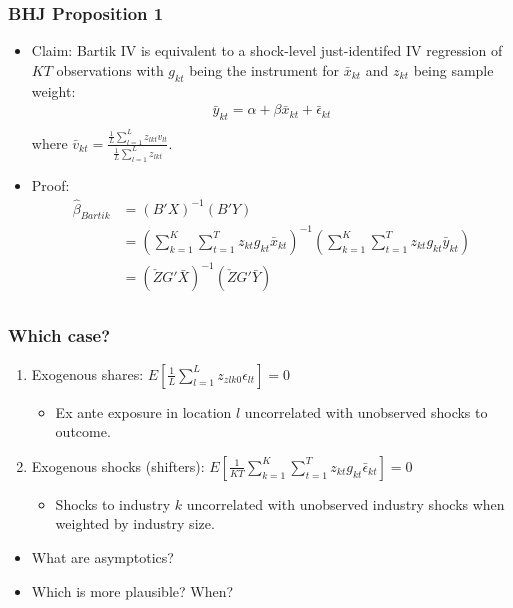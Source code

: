\documentclass[english,xcolor=svgnames]{beamer}
\begin{document}
\begin{frame}
\frametitle[alignment=center]{BHJ Proposition 1}
\begin{itemize}
	\item Claim: Bartik IV is equivalent to a shock-level just-identifed IV regression
	of $KT$ observations with $g_{kt}$ being the instrument for $ \bar{x}_{kt} $ and $z_{kt}$ being sample weight:
	\begin{align*}
		\bar{y}_{kt} = \alpha + \beta \bar{x}_{kt} + \bar{\epsilon}_{kt}\\
	\end{align*}
	where $\bar{v}_{kt} = \frac{\frac{1}{L}\sum_{l=1}^{L}z_{lkt}v_{lt}}{\frac{1}{L}\sum_{l=1}^{L}z_{lkt}}$.
	\item Proof:
	\begin{align*}
		\hat{\beta}_{Bartik} &= (B'X)^{-1}(B'Y) \\
		&=\left(\sum_{k=1}^K \sum_{t=1}^{T} z_{kt}    g_{kt} \bar{x}_{kt}\right)^{-1}\left(\sum_{k=1}^K \sum_{t=1}^{T} z_{kt}    g_{kt} \bar{y}_{kt}\right) \\
		&= (\check{Z}G'\bar{X})^{-1}(\check{Z}G'\bar{Y}) \\
	\end{align*}
\end{itemize}
\end{frame}




\begin{frame}
\frametitle[alignment=center]{Which case?}
\begin{enumerate}
	\item Exogenous shares: $E\left[\frac{1}{L}\sum_{l=1}^{L}z_{zlk0}\epsilon_{lt}\right] =0$
	\begin{itemize}
		\item Ex ante exposure in location $l$ uncorrelated with unobserved shocks to outcome.
	\end{itemize}
	\item Exogenous shocks (shifters): $E\left[\frac{1}{KT}\sum_{k=1}^K \sum_{t=1}^{T} z_{kt}    g_{kt} \bar{\epsilon}_{kt}\right] =0$
	\begin{itemize}
		\item Shocks to industry $k$ uncorrelated with unobserved industry shocks when weighted by industry size.
	\end{itemize}
\end{enumerate}
\begin{itemize}
	\item What are asymptotics?
	\item Which is more plausible? When?
\end{itemize}
\end{frame}
\end{document}
